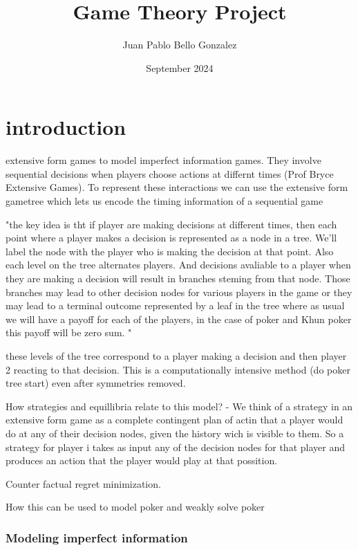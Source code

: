 \documentclass{article}
\title{Game Theory Project}
\author{Juan Pablo Bello Gonzalez}
\date{September 2024}
\begin{document}
\maketitle

\section{introduction}

extensive form games to model imperfect information games. They involve sequential decisions when players choose actions at differnt times (Prof Bryce Extensive Games).
To represent these interactions we can use the extensive form gametree which lets us encode the timing information of a sequential game

"the key idea is tht if player are making decisions at different times, then each point where a player makes a decision is represented as a node in a tree. We'll label the node with the player who is making the decision at that point. Also each level on the tree alternates players. And decisions avaliable to a player when they are making a decision will result in branches steming from that node. Those branches may lead to other decision nodes for various players in the game or they may lead to a terminal outcome represented by a leaf in the tree where as usual we will have a payoff for each of the players, in the case of poker and Khun poker this payoff will be zero sum. "

these levels of the tree correspond to a player making a decision and then player 2 reacting to that decision. This is a computationally intensive method (do poker tree start) even after symmetries removed. 

How strategies and equillibria relate to this model?
- We think of a strategy in an extensive form game as a complete contingent plan of actin that a player would do at any of their decision nodes, given the history wich is visible to them. 
So a strategy for player i takes as input any of the decision nodes for that player and produces an action that the player would play at that possition. 


Counter factual regret minimization. 

How this can be used to model poker and weakly solve poker 


\subsubsection{Modeling imperfect information}
\end{document}
